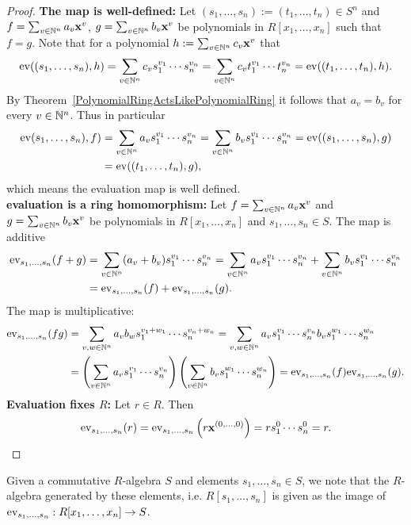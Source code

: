 \begin{proof}
    \textbf{The map is well-defined:} Let $(s_1,\dots,s_n):=(t_1,\dots,t_n)\in S^n$ and $f = \sum_{v\in \mathbb{N}^n} a_v \mathbf{x}^v$, $g = \sum_{v\in \mathbb{N}^n} b_v\mathbf{x}^v$ be polynomials in $R[x_1,\dots,x_n]$ such that $f=g$. Note that for a polynomial $h:=\sum_{v\in \mathbb{N}^n} c_v\mathbf{x}^v$ that 
    $$\mathrm{ev}((s_1,\dots,s_n),h)=\sum_{v\in\mathbb{N}^n} c_vs_1^{v_1}\cdots s_n^{v_n}= \sum_{v\in\mathbb{N}^n} c_vt_1^{v_1}\cdots t_n^{v_n} = \mathrm{ev}((t_1,\dots,t_n),h).$$
    By Theorem~\ref{PolynomialRingActsLikePolynomialRing} it follows that $a_v = b_v$ for every $v\in \mathbb{N}^n$. Thus in particular
    \begin{align*}
        \mathrm{ev}(s_1,\dots,s_n),f) &= \sum_{v\in \mathbb{N}^n} a_v s_1^{v_1}\cdots s_n^{v_n} = \sum_{v\in \mathbb{N}^n} b_v s_1^{v_1}\cdots s_n^{v_n} = \mathrm{ev}((s_1,\dots,s_n),g)\\ &= \mathrm{ev}((t_1,\dots,t_n),g),
    \end{align*}
    which means the evaluation map is well defined.\\
    \textbf{evaluation is a ring homomorphism:} Let $f = \sum_{v\in \mathbb{N}^n} a_v \mathbf{x}^v$ and $g = \sum_{v\in \mathbb{N}^n} b_v\mathbf{x}^v$ be polynomials in $R[x_1,\dots,x_n]$ and $s_1,\dots,s_n\in S$. The map is additive
    \begin{align*}
        \mathrm{ev}_{s_1,\dots,s_n}(f+g) &= \sum_{v\in\mathbb{N}^n} (a_v+b_v)s_1^{v_1}\cdots s_n^{v_n} = \sum_{v\in \mathbb{N}^n} a_vs_1^{v_1}\cdots s_n^{v_n} +\sum_{v\in \mathbb{N}^n}b_vs_1^{v_1}\cdots s_n^{v_n}\\ &= \mathrm{ev}_{s_1,\dots,s_n}(f)+\mathrm{ev}_{s_1,\dots,s_n}(g).
    \end{align*}
    The map is multiplicative: 
    \begin{align*}
        \mathrm{ev}_{s_1,\dots,s_n}(fg) &= \sum_{v,w\in \mathbb{N}^n} a_vb_w s_1^{v_1+w_1}\cdots s_n^{v_n+w_n} = \sum_{v,w\in \mathbb{N}^n} a_vs_1^{v_1}\cdots s_n^{v_n}b_vs_1^{w_1}\cdots s_n^{w_n}\\
        &= \left(\sum_{v\in \mathbb{N}^n} a_vs_1^{v_1}\cdots s_n^{v_n}\right)\left(\sum_{v\in \mathbb{N}^n} b_vs_1^{w_1}\cdots s_n^{w_n}\right) = \mathrm{ev}_{s_1,\dots,s_n}(f)\mathrm{ev}_{s_1,\dots,s_n}(g).
    \end{align*}
    \textbf{Evaluation fixes $R$:}
    Let $r\in R$. Then
    $$\mathrm{ev}_{s_1,\dots,s_n}(r)= \mathrm{ev}_{s_1,\dots,s_n}\left(r\mathbf{x}^{(0,\dots,0)}\right) = r s_1^{0}\cdots s_n^{0} = r.$$
\end{proof}
\begin{remark}
     Given a commutative $R$-algebra $S$ and elements $s_1,\dots,s_n\in S$, we note that the $R$-algebra generated by these elements, i.e. $R[s_1,\dots,s_n]$ is given as the image of $\mathrm{ev}_{s_1,\dots,s_n}: R[x_1,\dots,x_n]\rightarrow S$.
\end{remark}
